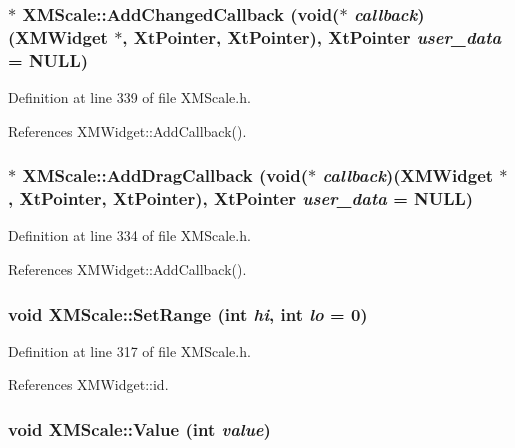 \subsubsection{$\ast$ XMScale::Add\-Changed\-Callback (void($\ast$ {\em callback})({\bf XMWidget} $\ast$, Xt\-Pointer, Xt\-Pointer), Xt\-Pointer {\em user\_\-data} = NULL)\hspace{0.3cm}{\tt  [inline]}}\label{classXMScale_a8}




Definition at line 339 of file XMScale.h.

References XMWidget::Add\-Callback().
\subsubsection{$\ast$ XMScale::Add\-Drag\-Callback (void($\ast$ {\em callback})({\bf XMWidget} $\ast$, Xt\-Pointer, Xt\-Pointer), Xt\-Pointer {\em user\_\-data} = NULL)\hspace{0.3cm}{\tt  [inline]}}\label{classXMScale_a7}




Definition at line 334 of file XMScale.h.

References XMWidget::Add\-Callback().
\subsubsection{\setlength{\rightskip}{0pt plus 5cm}void XMScale::Set\-Range (int {\em hi}, int {\em lo} = 0)\hspace{0.3cm}{\tt  [inline]}}\label{classXMScale_a4}




Definition at line 317 of file XMScale.h.

References XMWidget::id.
\subsubsection{\setlength{\rightskip}{0pt plus 5cm}void XMScale::Value (int {\em value})\hspace{0.3cm}{\tt  [inline]}}\label{classXMScale_a6}




